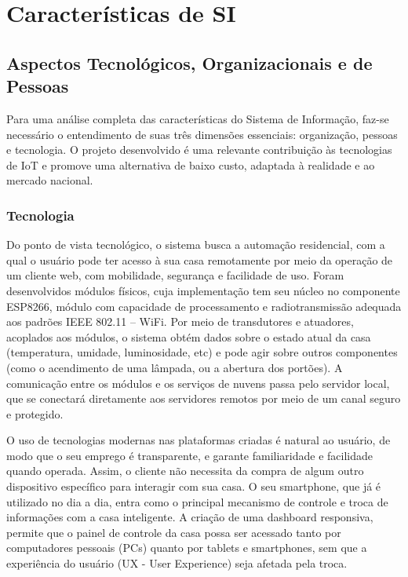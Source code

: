 \chapter{Características de SI}

\section{Aspectos Tecnológicos, Organizacionais e de Pessoas}

Para uma análise completa das características do Sistema de Informação, faz-se necessário o entendimento de suas três dimensões essenciais: organização, pessoas e tecnologia. O projeto desenvolvido é uma relevante contribuição às tecnologias de IoT e promove uma alternativa de baixo custo, adaptada à realidade e ao mercado nacional.

\subsection{Tecnologia}

Do ponto de vista tecnológico, o sistema busca a automação residencial, com a qual o usuário pode ter acesso à sua casa remotamente por meio da operação de um cliente web, com mobilidade, segurança e facilidade de uso. Foram desenvolvidos módulos físicos, cuja implementação tem seu núcleo no componente ESP8266, módulo com capacidade de processamento e radiotransmissão adequada aos padrões IEEE 802.11 -- WiFi. Por meio de transdutores e atuadores, acoplados aos módulos, o sistema obtém dados sobre o estado atual da casa (temperatura, umidade, luminosidade, etc) e pode agir sobre outros componentes (como o acendimento de uma lâmpada, ou a abertura dos portões). A comunicação entre os módulos e os serviços de nuvens passa pelo servidor local, que se conectará diretamente aos servidores remotos por meio de um canal seguro e protegido.

O uso de tecnologias modernas nas plataformas criadas é natural ao usuário, de modo que o seu emprego é transparente, e garante familiaridade e facilidade quando operada. Assim, o cliente não necessita da compra de algum outro dispositivo específico para interagir com sua casa. O seu smartphone, que já é utilizado no dia a dia, entra como o principal mecanismo de controle e troca de informações com a casa inteligente. A criação de uma dashboard responsiva, permite que o painel de controle da casa possa ser acessado tanto por computadores pessoais (PCs) quanto por tablets e smartphones, sem que a experiência do usuário (UX - User Experience) seja afetada pela troca.

